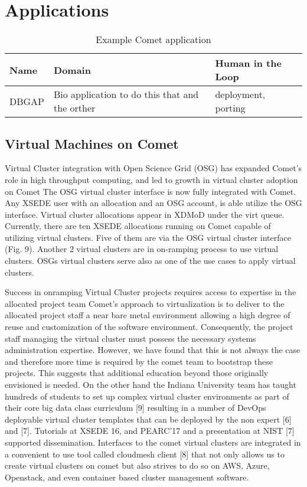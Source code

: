


\section{Applications}


\begin{table*}
  \caption{Example Comet application}
  \label{tab:examples}
  \begin{tabular}{p{2cm}p{3cm}p{8cm}}
    \toprule
    Name & Domain & Human in the Loop\\
    \midrule
    DBGAP & Bio application to do this that and the orther & deployment, porting \\
  \bottomrule
\end{tabular}
\end{table*}


\subsection{Virtual Machines on Comet}


Virtual Cluster integration with Open Science Grid (OSG) has expanded Comet’s role in high throughput computing, and led to growth in virtual cluster adoption on Comet
The OSG virtual cluster interface is now fully integrated with Comet. Any XSEDE user with an allocation and an OSG account, is able utilize the OSG interface. Virtual cluster allocations appear in XDMoD under the virt queue. Currently, there are ten XSEDE allocations running on Comet capable of utilizing virtual 
clusters.  Five of them are via the OSG virtual cluster interface (Fig. 9). Another 2 virtual clusters are in on-ramping process to use virtual clusters. OSGs virtual clusters serve also as one of the use cases to apply virtual clusters.




Success in onramping Virtual Cluster projects requires access to expertise in the allocated project team
Comet’s approach to virtualization is to deliver to the allocated project staff a near bare metal environment allowing a high degree of reuse and customization of the software environment. Consequently, the project staff managing the virtual cluster must possess the necessary systems administration expertise. However, we have found that this is not always the case and therefore more time is required by the comet team to bootstrap these projects. This suggests that additional education beyond those originally envisioned is needed. On the other hand the Indiana University team has taught hundreds of students to set up complex virtual cluster environments as part of their core big data class curriculum [9] resulting in a number of DevOps deployable virtual cluster templates that can be deployed by the non expert [6] and [7]. Tutorials at XSEDE 16, and PEARC’17 and a presentation at NIST [7] supported dissemination.  Interfaces to the comet virtual clusters are integrated in a convenient to use tool called cloudmesh client [8] that not only allows us to create virtual clusters on comet but also strives to do so on AWS, Azure, Openstack, and even container based cluster management software.

